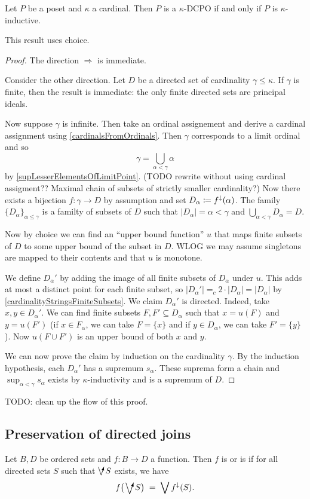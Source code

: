 \begin{proposition}
Let $P$ be a poset and $\kappa$ a cardinal. Then $P$ is a $\kappa$-DCPO \textup{if and only if} $P$ is $\kappa$-inductive.
\end{proposition}
This result uses choice.
\begin{proof}
The direction $\Rightarrow$ is immediate.

Consider the other direction. Let $D$ be a directed set of cardinality $\gamma \leq \kappa$. 
If $\gamma$ is finite, then the result is immediate: the only finite directed sets are principal ideals.

Now suppose $\gamma$ is infinite. Then take an ordinal assignement and derive a cardinal assignment using \ref{cardinalsFromOrdinals}. Then $\gamma$ corresponds to a limit ordinal and so
\[ \gamma = \bigcup_{\alpha < \gamma} \alpha \]
by \ref{supLesserElementsOfLimitPoint}. (TODO rewrite without using cardinal assigment?? Maximal chain of subsets of strictly smaller cardinality?) Now there exists a bijection $f: \gamma \to D$ by assumption and set $D_\alpha \coloneqq f^\downarrow(\alpha)$. The family $\{D_\alpha\}_{\alpha\leq\gamma}$ is a familty of subsets of $D$ such that $|D_\alpha| = \alpha < \gamma$ and $\bigcup_{\alpha < \gamma}D_\alpha = D$.


Now by choice we can find an ``upper bound function'' $u$ that maps finite subsets of $D$ to some upper bound of the subset in $D$. WLOG we may assume singletons are mapped to their contents and that $u$ is monotone.

We define $D_\alpha'$ by adding the image of all finite subsets of $D_\alpha$ under $u$. This adds at most a distinct point for each finite subset, so $|D_\alpha'| =_c 2\cdot|D_\alpha| = |D_\alpha|$ by \ref{cardinalityStringsFiniteSubsets}. We claim $D_\alpha'$ is directed. Indeed, take $x,y\in D_\alpha'$. 
We can find finite subsets $F,F'\subseteq D_\alpha$ such that $x = u(F)$ and $y = u(F')$ (if $x\in F_\alpha$, we can take $F = \{x\}$ and if $y\in D_\alpha$, we can take $F'= \{y\}$). Now $u(F\cup F')$ is an upper bound of both $x$ and $y$.

We can now prove the claim by induction on the cardinality $\gamma$. By the induction hypothesis, each $D_\alpha'$ has a supremum $s_\alpha$. These suprema form a chain and $\sup_{\alpha<\gamma}s_\alpha$ exists by $\kappa$-inductivity and is a supremum of $D$.
\end{proof}
TODO: clean up the flow of this proof.

\subsection{Preservation of directed joins}
\begin{definition}
Let $B,D$ be ordered sets and $f:B\to D$ a function. Then $f$ is  or is  if for all directed sets $S$ such that $\dirvee S$ exists, we have
\[ f\big(\dirvee S\big) \;=\; \bigvee f^\imf(S). \]
\end{definition}

